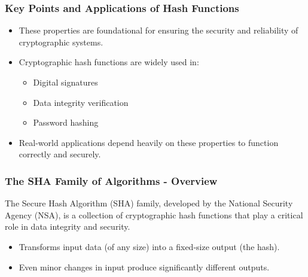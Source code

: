 \documentclass{beamer}
\begin{document}
\begin{frame}[fragile]
    \frametitle{Key Points and Applications of Hash Functions}
    \begin{itemize}
        \item These properties are foundational for ensuring the security and reliability of cryptographic systems.
        \item Cryptographic hash functions are widely used in:
        \begin{itemize}
            \item Digital signatures
            \item Data integrity verification
            \item Password hashing
        \end{itemize}
        \item Real-world applications depend heavily on these properties to function correctly and securely.
    \end{itemize}
\end{frame}

\begin{frame}[fragile]
    \frametitle{The SHA Family of Algorithms - Overview}
    The Secure Hash Algorithm (SHA) family, developed by the National Security Agency (NSA), is a collection of cryptographic hash functions that play a critical role in data integrity and security. 
    \begin{itemize}
        \item Transforms input data (of any size) into a fixed-size output (the hash).
        \item Even minor changes in input produce significantly different outputs.
    \end{itemize}
\end{frame}
\end{document}
